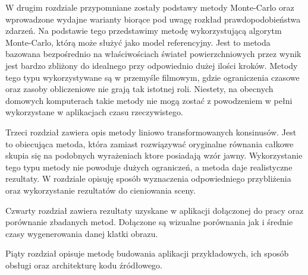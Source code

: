 \documentclass[../main.tex]{subfiles}
\begin{document}
W drugim rozdziale przypomniane zostały podstawy metody Monte-Carlo oraz wprowadzone wydajne warianty biorące pod uwagę rozkład prawdopodobieństwa zdarzeń. Na podstawie tego przedstawimy metodę wykorzystującą algorytm Monte-Carlo, którą może służyć jako model referencyjny. Jest to metoda bazowana bezpośrednio na właściwościach świateł powierzchniowych przez wynik jest bardzo zbliżony do idealnego przy odpowiednio dużej ilości kroków. Metody tego typu wykorzystywane są w przemyśle filmowym, gdzie ograniczenia czasowe oraz zasoby obliczeniowe nie grają tak istotnej roli. Niestety, na obecnych domowych komputerach takie metody nie mogą zostać z powodzeniem w pełni wykorzystane w aplikacjach czasu rzeczywistego. 

Trzeci rozdział zawiera opis metody liniowo transformowanych konsinusów. Jest to obiecująca metoda, która zamiast rozwiązywać oryginalne równania całkowe skupia się na podobnych wyrażeniach ktore posiadają wzór jawny. Wykorzystanie tego typu metody nie powoduje dużych ograniczeń, a metoda daje realistyczne rezultaty. W rozdziale opisuję sposób wyznaczenia odpowiedniego przybliżenia oraz wykorzystanie rezultatów do cieniowania sceny.

Czwarty rozdział zawiera rezultaty uzyskane w aplikacji dołączonej do pracy oraz porównanie zbadanych metod. Dołączone są wizualne porównania jak i średnie czasy wygenerowania danej klatki obrazu.

Piąty rozdział opisuje metodę budowania aplikacji przykładowych, ich sposób obsługi oraz architekturę kodu źródłowego.
\end{document}
